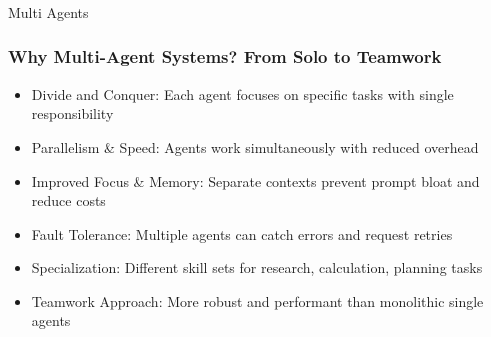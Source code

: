 \begin{frame}[fragile]\frametitle{}
\begin{center}
{\Large Multi Agents}
\end{center}
\end{frame}

\begin{frame}[fragile]\frametitle{Why Multi-Agent Systems? From Solo to Teamwork}
      \begin{itemize}
		\item Divide and Conquer: Each agent focuses on specific tasks with single responsibility
		\item Parallelism \& Speed: Agents work simultaneously with reduced overhead
		\item Improved Focus \& Memory: Separate contexts prevent prompt bloat and reduce costs
		\item Fault Tolerance: Multiple agents can catch errors and request retries
		\item Specialization: Different skill sets for research, calculation, planning tasks
		\item Teamwork Approach: More robust and performant than monolithic single agents
	  \end{itemize}
\end{frame}

